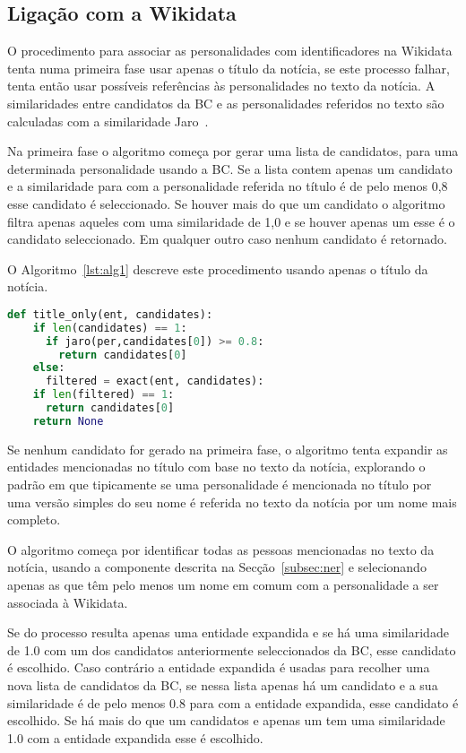 \documentclass[a4paper, twocolumn, 11pt, twoside]{article}
\begin{document}
\subsection{Ligação com a Wikidata}
\label{subsec:ent_linking}

O procedimento para associar as personalidades com identificadores na Wikidata tenta numa primeira fase usar apenas o título da notícia, se este processo falhar, tenta então usar possíveis referências às personalidades no texto da notícia. A similaridades entre candidatos da BC e as personalidades referidos no texto são calculadas com a similaridade Jaro~\citep{jaro1989}.

Na primeira fase o algoritmo começa por gerar uma lista de candidatos, para uma determinada personalidade usando a BC. Se a lista contem apenas um candidato e a similaridade para com a personalidade referida no título é de pelo menos 0,8 esse candidato é seleccionado. Se houver mais do que um candidato o algoritmo filtra apenas aqueles com uma similaridade de 1,0 e se houver apenas um esse é o candidato seleccionado. Em qualquer outro caso nenhum candidato é retornado. 

O Algoritmo~\ref{lst:alg1} descreve este procedimento usando apenas o título da notícia.

\begin{lstlisting}[language=python,columns=fullflexible,frame=single,label={lst:alg1},title={Algoritmo 6.1. Ligação com a Wikidata usando apenas o título.},captionpos=b]
def title_only(ent, candidates):
    if len(candidates) == 1:
      if jaro(per,candidates[0]) >= 0.8:
        return candidates[0]
    else:
      filtered = exact(ent, candidates):
	if len(filtered) == 1:
	  return candidates[0]
    return None
\end{lstlisting}

Se nenhum candidato for gerado na primeira fase, o algoritmo tenta expandir as entidades mencionadas no título com base no texto da notícia, explorando o padrão em que tipicamente se uma personalidade é mencionada no título por uma versão simples do seu nome é referida no texto da notícia por um nome mais completo.

O algoritmo começa por identificar todas as pessoas mencionadas no texto da notícia, usando a componente descrita na Secção~\ref{subsec:ner} e selecionando apenas as que têm pelo menos um nome em comum com a personalidade a ser associada à Wikidata. 

Se do processo resulta apenas uma entidade expandida e se há uma similaridade de 1.0 com um dos candidatos anteriormente seleccionados da BC, esse candidato é escolhido. Caso contrário a entidade expandida é usadas para recolher uma nova lista de candidatos da BC, se nessa lista apenas há um candidato e a sua similaridade é de pelo menos 0.8 para com a entidade expandida, esse candidato é escolhido. Se há mais do que um candidatos e apenas um tem uma similaridade 1.0 com a entidade expandida esse é escolhido. 
\end{document}
